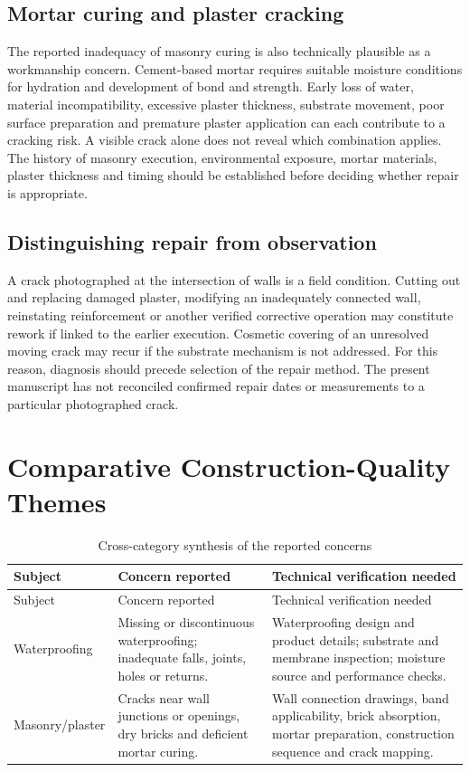 \subsection{Mortar curing and plaster cracking}
The reported inadequacy of masonry curing is also technically plausible as a workmanship concern. Cement-based mortar requires suitable moisture conditions for hydration and development of bond and strength. Early loss of water, material incompatibility, excessive plaster thickness, substrate movement, poor surface preparation and premature plaster application can each contribute to a cracking risk. A visible crack alone does not reveal which combination applies. The history of masonry execution, environmental exposure, mortar materials, plaster thickness and timing should be established before deciding whether repair is appropriate.

\subsection{Distinguishing repair from observation}
A crack photographed at the intersection of walls is a field condition. Cutting out and replacing damaged plaster, modifying an inadequately connected wall, reinstating reinforcement or another verified corrective operation may constitute rework if linked to the earlier execution. Cosmetic covering of an unresolved moving crack may recur if the substrate mechanism is not addressed. For this reason, diagnosis should precede selection of the repair method. The present manuscript has not reconciled confirmed repair dates or measurements to a particular photographed crack.


\section{Comparative Construction-Quality Themes}
\begin{longtable}{@{}L{0.25\textwidth}L{0.27\textwidth}L{0.36\textwidth}@{}}
\caption{Cross-category synthesis of the reported concerns}\label{tab:crosscategory}\\
\toprule Subject & Concern reported & Technical verification needed\\ \midrule\endfirsthead
\toprule Subject & Concern reported & Technical verification needed\\ \midrule\endhead
Waterproofing & Missing or discontinuous waterproofing; inadequate falls, joints, holes or returns. & Waterproofing design and product details; substrate and membrane inspection; moisture source and performance checks.\\
Masonry/plaster & Cracks near wall junctions or openings, dry bricks and deficient mortar curing. & Wall connection drawings, band applicability, brick absorption, mortar preparation, construction sequence and crack mapping.\\ \bottomrule
\end{longtable}

